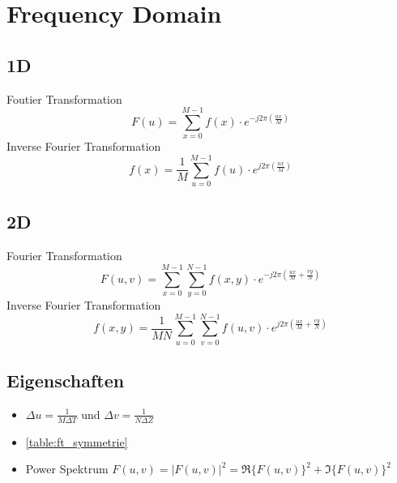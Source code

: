 \section{Frequency Domain}
\subsection{1D} 
Foutier Transformation
\[
F(u) = \sum_{x=0}^{M-1}f(x)\cdot e ^{-j2\pi\left(\frac{ux}{M}\right)}
\]
Inverse Fourier Transformation
\[
f(x) = \frac{1}{M} \sum_{u=0}^{M-1}f(u)\cdot e ^{j2\pi\left(\frac{ux}{M}\right)}
\]

\subsection{2D}
Fourier Transformation
\[
F(u,v) = \sum_{x=0}^{M-1}\sum_{y=0}^{N-1}f(x, y)\cdot e ^{-j2\pi\left(\frac{ux}{M}+\frac{vy}{N}\right)}
\]
Inverse Fourier Transformation
\[
f(x, y) = \frac{1}{MN} \sum_{u=0}^{M-1}\sum_{v=0}^{N-1}f(u, v)\cdot e ^{j2\pi\left(\frac{ux}{M}+\frac{vy}{N}\right)}
\]

\subsection{Eigenschaften}
\begin{itemize}
	\item $\Delta u = \frac{1}{M\Delta T}$ und $\Delta v = \frac{1}{N\Delta Z}$
	\item \autoref{table:ft_symmetrie}
	\item Power Spektrum $F(u,v) = \left|F(u,v)\right|^2 = \Re\{F(u,v)\}^2 + \Im\{F(u,v)\}^2$
\end{itemize}
